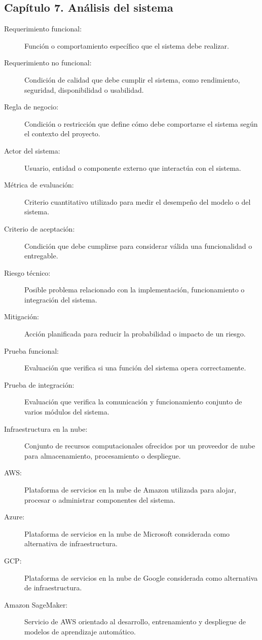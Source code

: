 \subsection*{Capítulo 7. Análisis del sistema}
\begin{description}
    \item[Requerimiento funcional:] Función o comportamiento específico que el sistema debe realizar.
    \item[Requerimiento no funcional:] Condición de calidad que debe cumplir el sistema, como rendimiento, seguridad, disponibilidad o usabilidad.
    \item[Regla de negocio:] Condición o restricción que define cómo debe comportarse el sistema según el contexto del proyecto.
    \item[Actor del sistema:] Usuario, entidad o componente externo que interactúa con el sistema.
    \item[Métrica de evaluación:] Criterio cuantitativo utilizado para medir el desempeño del modelo o del sistema.
    \item[Criterio de aceptación:] Condición que debe cumplirse para considerar válida una funcionalidad o entregable.
    \item[Riesgo técnico:] Posible problema relacionado con la implementación, funcionamiento o integración del sistema.
    \item[Mitigación:] Acción planificada para reducir la probabilidad o impacto de un riesgo.
    \item[Prueba funcional:] Evaluación que verifica si una función del sistema opera correctamente.
    \item[Prueba de integración:] Evaluación que verifica la comunicación y funcionamiento conjunto de varios módulos del sistema.
    \item[Infraestructura en la nube:] Conjunto de recursos computacionales ofrecidos por un proveedor de nube para almacenamiento, procesamiento o despliegue.
    \item[AWS:] Plataforma de servicios en la nube de Amazon utilizada para alojar, procesar o administrar componentes del sistema.
    \item[Azure:] Plataforma de servicios en la nube de Microsoft considerada como alternativa de infraestructura.
    \item[GCP:] Plataforma de servicios en la nube de Google considerada como alternativa de infraestructura.
    \item[Amazon SageMaker:] Servicio de AWS orientado al desarrollo, entrenamiento y despliegue de modelos de aprendizaje automático.

\end{description}
